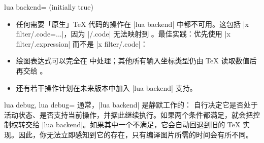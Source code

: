 {\begin{pgfplotskey}{lua backend= (initially true)}
\begin{itemize}
\begin{codeexample}[]
\end{codeexample}

            两者在语义上是等价的，但由于 \lua{} 无法解释 \TeX{} 宏，它会拒绝处理「Don't」这一情形。「Don't」情形会产生一条日志消息
\begin{verbatim}
Package pgfplots info on input line 16: Deactivating LUA version of
plot expression for plot 0 (type 'pgfplothandlerlineto'):
y expression '\constantC *x' contains a TeX macro.
\end{verbatim}
        \item 任何需要「原生」\TeX{} 代码的操作在 |lua backend| 中都不可用。这包括 |x filter/.code={...}|，因为 |/.code| 无法映射到 \lua。最佳实践：优先使用 |x filter/.expression| 而不是 |x filter/.code|：
\begin{codeexample}[]
\end{codeexample}
        \item 绘图表达式可以完全在 \lua 中处理；其他所有输入坐标类型仍由 \TeX{} 读取数值后再交给 \lua。
        \item 还有若干操作计划在未来版本中加入 |lua backend| 支持。
    \end{itemize}
\end{pgfplotskey}

\begin{pgfplotskeylist}{%
    lua debug,
    lua debug=%
}
    通常，|lua backend| 是静默工作的：\PGFPlots{} 自行决定它是否处于活动状态、是否支持当前操作，并据此继续执行。如果两个条件都满足，就会把控制权转交给 |lua backend|。如果其中一个不满足，它会自动回退到旧的 \TeX{} 实现。因此，你无法立即感知到它的存在，只有编译图片所需的时间会有所不同。


\end{pgfplotskeylist}}
